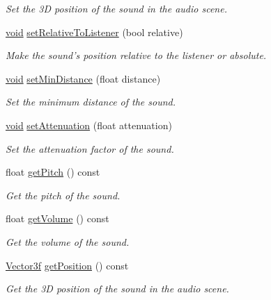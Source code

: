 \begin{DoxyCompactItemize}
\begin{DoxyCompactList}\small\item\em Set the 3\-D position of the sound in the audio scene. \end{DoxyCompactList}\item 
\hyperlink{glutf90_8h_ac778d6f63f1aaf8ebda0ce6ac821b56e}{void} \hyperlink{classsf_1_1_sound_source_ac478a8b813faf7dd575635b102081d0d}{set\-Relative\-To\-Listener} (bool relative)
\begin{DoxyCompactList}\small\item\em Make the sound's position relative to the listener or absolute. \end{DoxyCompactList}\item 
\hyperlink{glutf90_8h_ac778d6f63f1aaf8ebda0ce6ac821b56e}{void} \hyperlink{classsf_1_1_sound_source_a75bbc2c34addc8b25a14edb908508afe}{set\-Min\-Distance} (float distance)
\begin{DoxyCompactList}\small\item\em Set the minimum distance of the sound. \end{DoxyCompactList}\item 
\hyperlink{glutf90_8h_ac778d6f63f1aaf8ebda0ce6ac821b56e}{void} \hyperlink{classsf_1_1_sound_source_aa2adff44cd2f8b4e3c7315d7c2a45626}{set\-Attenuation} (float attenuation)
\begin{DoxyCompactList}\small\item\em Set the attenuation factor of the sound. \end{DoxyCompactList}\item 
float \hyperlink{classsf_1_1_sound_source_aedad6aff442aeb6dcd267befd4fdbb59}{get\-Pitch} () const 
\begin{DoxyCompactList}\small\item\em Get the pitch of the sound. \end{DoxyCompactList}\item 
float \hyperlink{classsf_1_1_sound_source_aafb0558fce9cbebfc6828d932cbcce2f}{get\-Volume} () const 
\begin{DoxyCompactList}\small\item\em Get the volume of the sound. \end{DoxyCompactList}\item 
\hyperlink{namespacesf_af97357d7d32e7d6a700d03be2f3b4811}{Vector3f} \hyperlink{classsf_1_1_sound_source_a4c3bc60286f488aaf2941ab76476eebc}{get\-Position} () const 
\begin{DoxyCompactList}\small\item\em Get the 3\-D position of the sound in the audio scene. \end{DoxyCompactList}\item 

\end{DoxyCompactItemize}
